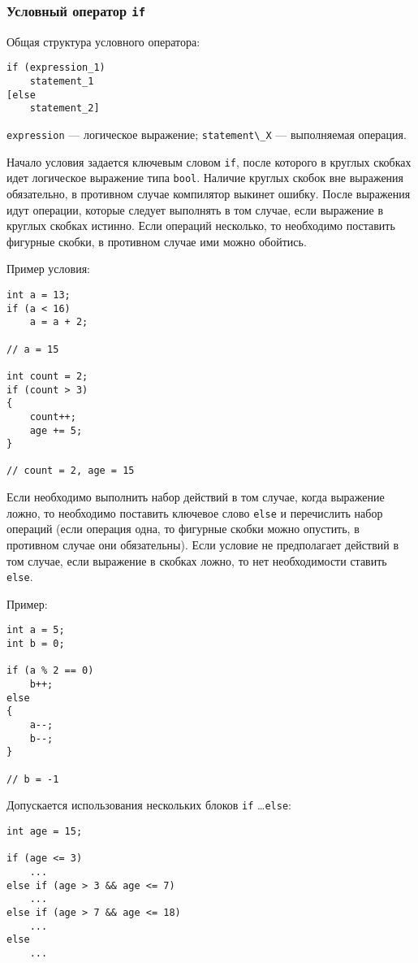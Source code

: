 \subsubsection{Условный оператор \texttt{if}}
Общая структура условного оператора:
\begin{lstlisting}
if (expression_1)
    statement_1
[else
    statement_2]
\end{lstlisting}

\lstinline|expression| --- логическое выражение; \lstinline|statement\_X| --- выполняемая операция.

Начало условия задается ключевым словом \lstinline|if|, после которого в круглых скобках идет логическое выражение типа \lstinline|bool|. Наличие круглых скобок вне выражения обязательно, в противном случае компилятор выкинет ошибку. После выражения идут операции, которые следует выполнять в том случае, если выражение в круглых скобках истинно. Если операций несколько, то необходимо поставить фигурные скобки, в противном случае ими можно обойтись.

Пример условия:

\begin{lstlisting}
int a = 13;
if (a < 16)
    a = a + 2;

// a = 15

int count = 2;
if (count > 3)
{
    count++;
    age += 5;
}

// count = 2, age = 15
\end{lstlisting}

Если необходимо выполнить набор действий в том случае, когда выражение ложно, то необходимо поставить ключевое слово \lstinline|else| и перечислить набор операций (если операция одна, то фигурные скобки можно опустить, в противном случае они обязательны). Если условие не предполагает действий в том случае, если выражение в скобках ложно, то нет необходимости ставить \lstinline|else|.

Пример:
\begin{lstlisting}
int a = 5;
int b = 0;

if (a % 2 == 0)
    b++;
else
{
    a--;
    b--;
}

// b = -1
\end{lstlisting}

Допускается использования нескольких блоков \lstinline|if| \ldots \lstinline|else|:

\begin{lstlisting}
int age = 15;

if (age <= 3)
    ...
else if (age > 3 && age <= 7)
    ...
else if (age > 7 && age <= 18)
    ...
else
    ...
\end{lstlisting}

